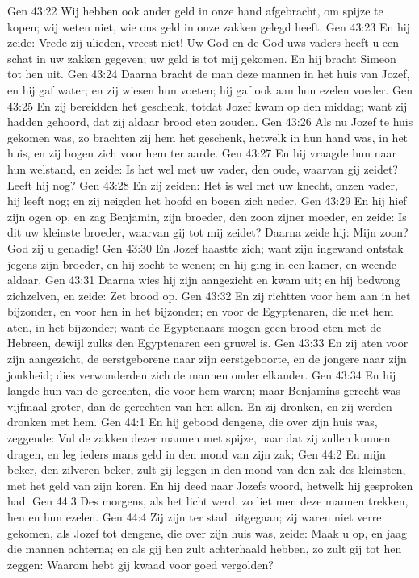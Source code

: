 Gen 43:22  Wij hebben ook ander geld in onze hand afgebracht, om spijze te kopen; wij weten niet, wie ons geld in onze zakken gelegd heeft.
Gen 43:23  En hij zeide: Vrede zij ulieden, vreest niet! Uw God en de God uws vaders heeft u een schat in uw zakken gegeven; uw geld is tot mij gekomen. En hij bracht Simeon tot hen uit.
Gen 43:24  Daarna bracht de man deze mannen in het huis van Jozef, en hij gaf water; en zij wiesen hun voeten; hij gaf ook aan hun ezelen voeder.
Gen 43:25  En zij bereidden het geschenk, totdat Jozef kwam op den middag; want zij hadden gehoord, dat zij aldaar brood eten zouden.
Gen 43:26  Als nu Jozef te huis gekomen was, zo brachten zij hem het geschenk, hetwelk in hun hand was, in het huis, en zij bogen zich voor hem ter aarde.
Gen 43:27  En hij vraagde hun naar hun welstand, en zeide: Is het wel met uw vader, den oude, waarvan gij zeidet? Leeft hij nog?
Gen 43:28  En zij zeiden: Het is wel met uw knecht, onzen vader, hij leeft nog; en zij neigden het hoofd en bogen zich neder.
Gen 43:29  En hij hief zijn ogen op, en zag Benjamin, zijn broeder, den zoon zijner moeder, en zeide: Is dit uw kleinste broeder, waarvan gij tot mij zeidet? Daarna zeide hij: Mijn zoon? God zij u genadig!
Gen 43:30  En Jozef haastte zich; want zijn ingewand ontstak jegens zijn broeder, en hij zocht te wenen; en hij ging in een kamer, en weende aldaar.
Gen 43:31  Daarna wies hij zijn aangezicht en kwam uit; en hij bedwong zichzelven, en zeide: Zet brood op.
Gen 43:32  En zij richtten voor hem aan in het bijzonder, en voor hen in het bijzonder; en voor de Egyptenaren, die met hem aten, in het bijzonder; want de Egyptenaars mogen geen brood eten met de Hebreen, dewijl zulks den Egyptenaren een gruwel is.
Gen 43:33  En zij aten voor zijn aangezicht, de eerstgeborene naar zijn eerstgeboorte, en de jongere naar zijn jonkheid; dies verwonderden zich de mannen onder elkander.
Gen 43:34  En hij langde hun van de gerechten, die voor hem waren; maar Benjamins gerecht was vijfmaal groter, dan de gerechten van hen allen. En zij dronken, en zij werden dronken met hem.
Gen 44:1  En hij gebood dengene, die over zijn huis was, zeggende: Vul de zakken dezer mannen met spijze, naar dat zij zullen kunnen dragen, en leg ieders mans geld in den mond van zijn zak;
Gen 44:2  En mijn beker, den zilveren beker, zult gij leggen in den mond van den zak des kleinsten, met het geld van zijn koren. En hij deed naar Jozefs woord, hetwelk hij gesproken had.
Gen 44:3  Des morgens, als het licht werd, zo liet men deze mannen trekken, hen en hun ezelen.
Gen 44:4  Zij zijn ter stad uitgegaan; zij waren niet verre gekomen, als Jozef tot dengene, die over zijn huis was, zeide: Maak u op, en jaag die mannen achterna; en als gij hen zult achterhaald hebben, zo zult gij tot hen zeggen: Waarom hebt gij kwaad voor goed vergolden?
